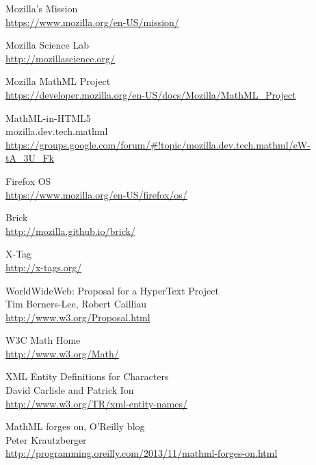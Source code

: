\begin{thebibliography}{7}

Mozilla's Mission \\
\href{https://www.mozilla.org/en-US/mission/}{https://www.mozilla.org/en-US/mission/}

Mozilla Science Lab \\
\href{http://mozillascience.org/}{http://mozillascience.org/}

Mozilla MathML Project \\
\href{https://developer.mozilla.org/en-US/docs/Mozilla/MathML_Project}{https://developer.mozilla.org/en-US/docs/Mozilla/MathML\_Project}

MathML-in-HTML5 \\
mozilla.dev.tech.mathml \\
\href{https://groups.google.com/forum/#!topic/mozilla.dev.tech.mathml/eW-tA_3U_Fk}{https://groups.google.com/forum/\#!topic/mozilla.dev.tech.mathml/eW-tA\_3U\_Fk}

Firefox OS \\
\href{https://www.mozilla.org/en-US/firefox/os/}{https://www.mozilla.org/en-US/firefox/os/}

Brick \\
\href{http://mozilla.github.io/brick/}{http://mozilla.github.io/brick/}

X-Tag \\
\href{http://x-tags.org/}{http://x-tags.org/}

WorldWideWeb: Proposal for a HyperText Project \\
Tim Berners-Lee, Robert Cailliau \\
\href{http://www.w3.org/Proposal.html}{http://www.w3.org/Proposal.html}

W3C Math Home \\
\href{http://www.w3.org/Math/}{http://www.w3.org/Math/}

XML Entity Definitions for Characters \\
David Carlisle and Patrick Ion \\
\href{http://www.w3.org/TR/xml-entity-names/}{http://www.w3.org/TR/xml-entity-names/}

MathML forges on, O'Reilly blog \\
Peter Krautzberger \\
\href{http://programming.oreilly.com/2013/11/mathml-forges-on.html}{http://programming.oreilly.com/2013/11/mathml-forges-on.html}


\end{thebibliography}
